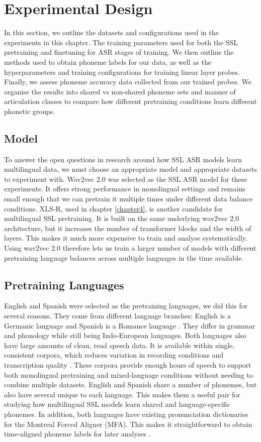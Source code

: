 \newpage
\section{Experimental Design}\label{ed_sec:experimental_design}
In this section, we outline the datasets and configurations used in the experiments in this chapter. The training parameters used for both the SSL pretraining and finetuning for ASR stages of training. We then outline the methods used to obtain phoneme labels for our data, as well as the hyperparameters and training configurations for training linear layer probes. Finally, we assess phoneme accuracy data collected from our trained probes. We organise the results into shared vs non‑shared phoneme sets and manner of articulation classes to compare how different pretraining conditions learn different phonetic groups. 

\subsection{Model}
To answer the open questions in research around how SSL ASR models learn multilingual data, we must choose an appropriate model and appropriate datasets to experiment with. Wav2vec 2.0 was selected as the SSL ASR model for these experiments. It offers strong performance in monolingual settings \cite{wav2vec} and remains small enough that we can pretrain it multiple times under different data balance conditions. XLS‑R, used in chapter \ref{chapter4}, is another candidate for multilingual SSL pretraining. It is built on the same underlying wav2vec 2.0 architecture, but it increases the number of transformer blocks and the width of layers. This makes it much more expensive to train and analyse systematically. Using wav2vec 2.0 therefore lets us train a larger number of models with different pretraining language balances across multiple languages in the time available. 

\subsection{Pretraining Languages}
English and Spanish were selected as the pretraining languages, we did this for several reasons. They come from different language branches: English is a Germanic language and Spanish is a Romance language \cite{bauer2007linguistics}. They differ in grammar and phonology while still being Indo‑European languages. Both languages also have large amounts of clean, read speech data. It is available within single, consistent corpora, which reduces variation in recording conditions and transcription quality \cite{librispeech,MLS}. These corpora provide enough hours of speech to support both monolingual pretraining and mixed‑language conditions without needing to combine multiple datasets. English and Spanish share a number of phonemes, but also have several unique to each language. This makes them a useful pair for studying how multilingual SSL models learn shared and language‑specific phonemes. In addition, both languages have existing pronunciation dictionaries for the Montreal Forced Aligner (MFA). This makes it straightforward to obtain time‑aligned phoneme labels for later analyses \cite{mcauliffe2017montreal}.


